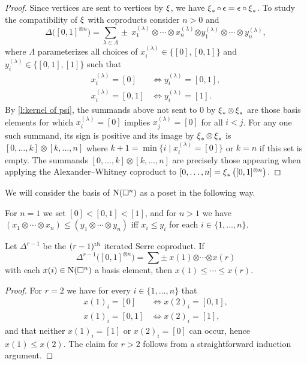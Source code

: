 \begin{proof}
	Since vertices are sent to vertices by $\operatorname{\xi}$, we have $\operatorname{\xi}_\ast \circ \, \epsilon = \epsilon \circ \operatorname{\xi}_\ast$.
	To study the compatibility of $\operatorname{\xi}$ with coproducts consider $n > 0$ and
	\[
	\Delta \big( [0,1]^{\otimes n} \big) = \sum_{\lambda \in \Lambda} \pm \ x_1^{(\lambda)} \otimes \cdots \otimes x_n^{(\lambda)} \bm{\otimes} y_1^{(\lambda)} \otimes \cdots \otimes y_n^{(\lambda)},
	\]
	where $\Lambda$ parameterizes all choices of $x_i^{(\lambda)} \in \{[0], [0,1]\}$ and $y_i^{(\lambda)} \in \{[0,1], [1]\}$ such that
	\begin{align*}
	x_i^{(\lambda)} = [0]   & \iff y_i^{(\lambda)} = [0,1], \\
	x_i^{(\lambda)} = [0,1] & \iff y_i^{(\lambda)} = [1].
	\end{align*}
	By \cref{l:kernel of psi}, the summands above not sent to $0$ by $\operatorname{\xi}_\ast \otimes \operatorname{\xi}_\ast$ are those basis elements for which $x_i^{(\lambda)} = [0]$ implies $x_j^{(\lambda)} = [0]$ for all $i < j$.
	For any one such summand, its sign is positive and its image by $\operatorname{\xi}_\ast \otimes \operatorname{\xi}_\ast$ is $[0, \dots, k] \otimes [k, \dots, n]$ where $k+1 = \min \{i \mid x_i^{(\lambda)} = [0]\}$ or $k = n$ if this set is empty.
	The summands $[0, \dots, k] \otimes [k, \dots, n]$ are precisely those appearing when applying the Alexander--Whitney coproduct to $[0, \dots, n] = \operatorname{\xi}_\ast \big( [0,1]^{\otimes n} \big)$.
\end{proof}

We will consider the basis of $\operatorname{N}(\square^n)$ as a poset in the following way.

\begin{definition}
	For $n = 1$ we set $[0] < [0,1] < [1]$, and for $n > 1$ we have $(x_1 \otimes \cdots \otimes x_n) \leq (y_1 \otimes \cdots \otimes y_n)$ iff $x_i \leq y_i$ for each $i \in \{1, \dots, n\}$.
\end{definition}

\begin{lemma}
	Let $\Delta^{r-1}$ be the $(r-1)^{\mathrm{th}}$ iterated Serre coproduct.
	If
	\[
	\Delta^{r-1} \big([0,1]^{\otimes n}\big) =
	\sum \pm \ x{(1)} \bm{\otimes} \cdots \bm{\otimes} x{(r)}
	\]
	with each $x(i) \in \operatorname{N}(\square^n)$ a basis element, then $x{(1)} \leq \cdots \leq x{(r)}$.
\end{lemma}

\begin{proof}
	For $r = 2$ we have for every $i \in \{1, \dots, n\}$ that
	\begin{align*}
	x(1)_i = [0]   & \iff x(2)_i = [0,1], \\
	x(1)_i = [0,1] & \iff x(2)_i = [1],
	\end{align*}
	and that neither $x(1)_i = [1]$ or $x(2)_i = [0]$ can occur, hence $x(1) \leq x(2)$.
	The claim for $r > 2$ follows from a straightforward induction argument.
\end{proof}

